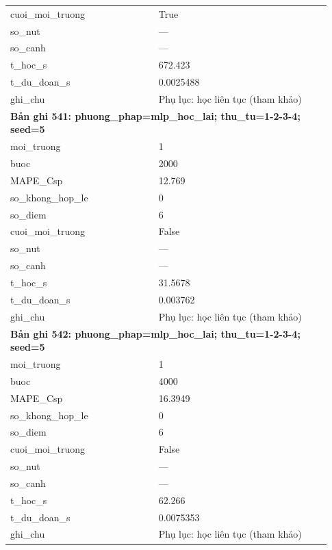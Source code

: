 \begin{longtable}{p{0.43\linewidth}p{0.50\linewidth}}
cuoi\_\allowbreak moi\_\allowbreak truong & True \\
so\_\allowbreak nut & — \\
so\_\allowbreak canh & — \\
t\_\allowbreak hoc\_\allowbreak s & 672.423 \\
t\_\allowbreak du\_\allowbreak doan\_\allowbreak s & 0.0025488 \\
ghi\_\allowbreak chu & Phụ lục: học liên tục (tham khảo) \\
\midrule
\multicolumn{2}{p{0.95\linewidth}}{\textbf{Bản ghi 541: phuong\_phap=mlp\_hoc\_lai; thu\_tu=1-2-3-4; seed=5}} \\
moi\_\allowbreak truong & 1 \\
buoc & 2000 \\
MAPE\_\allowbreak Csp & 12.769 \\
so\_\allowbreak khong\_\allowbreak hop\_\allowbreak le & 0 \\
so\_\allowbreak diem & 6 \\
cuoi\_\allowbreak moi\_\allowbreak truong & False \\
so\_\allowbreak nut & — \\
so\_\allowbreak canh & — \\
t\_\allowbreak hoc\_\allowbreak s & 31.5678 \\
t\_\allowbreak du\_\allowbreak doan\_\allowbreak s & 0.003762 \\
ghi\_\allowbreak chu & Phụ lục: học liên tục (tham khảo) \\
\midrule
\multicolumn{2}{p{0.95\linewidth}}{\textbf{Bản ghi 542: phuong\_phap=mlp\_hoc\_lai; thu\_tu=1-2-3-4; seed=5}} \\
moi\_\allowbreak truong & 1 \\
buoc & 4000 \\
MAPE\_\allowbreak Csp & 16.3949 \\
so\_\allowbreak khong\_\allowbreak hop\_\allowbreak le & 0 \\
so\_\allowbreak diem & 6 \\
cuoi\_\allowbreak moi\_\allowbreak truong & False \\
so\_\allowbreak nut & — \\
so\_\allowbreak canh & — \\
t\_\allowbreak hoc\_\allowbreak s & 62.266 \\
t\_\allowbreak du\_\allowbreak doan\_\allowbreak s & 0.0075353 \\
ghi\_\allowbreak chu & Phụ lục: học liên tục (tham khảo) \\

\end{longtable}
